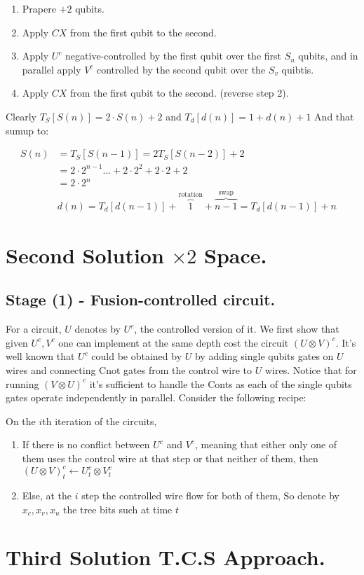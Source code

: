 \documentclass[manuscript,screen,review]{acmart}
\begin{document}
\begin{enumerate}
  \item Prapere $+2$ qubits.
  \item Apply $CX$ from the first qubit to the second.
  \item Apply $U^{c}$ negative-controlled by the first qubit over the first $S_{u}$ qubits, and in parallel apply $V^{c}$ controlled by the second qubit over the $S_{v}$ quibtis.   
  \item Apply $CX$ from the first qubit to the second. (reverse step 2).
\end{enumerate}
Clearly $T_{S}[S(n)] = 2 \cdot S(n) + 2$ and $T_{d}[d(n)] = 1 + d(n) + 1$ And that sumup to:

 
\begin{equation*}
\begin{split} S(n) & = T_{S}[S(n-1)] = 2T_{S}[S(n-2)] + 2  & \\ & = 
2\cdot 2^{n - 1}...+2\cdot 2^{2} +2\cdot 2 + 2 & \\ & = 2\cdot 2^{n} & \\ & d(n) = T_{d}[d(n-1)] + \overbrace{1}^{ \text{rotation} } + \overbrace{n-1}^{\text{swap}} =  T_{d}[d(n-1)] + n   \end{split} 
\end{equation*}

\section{Second Solution $\times 2$ Space. }

\subsection{Stage (1) - Fusion-controlled circuit.}

For a circuit, $U$ denotes by $U^{c}$, the controlled version of it. We first show that given $U^{c},V^{c}$ one can implement at the same depth cost the circuit $(U\otimes V)^{c}$. It's well known that $U^{c}$ could be obtained by $U$ by adding single qubits gates on $U$ wires and connecting Cnot gates from the control wire to $U$ wires. Notice that for running $(V\otimes U)^{c}$ it's sufficient to handle the Conts as each of the single qubits gates operate independently in parallel. Consider the following recipe: 

On the $i$th iteration of the circuits,
\begin{enumerate}  
  \item If there is no conflict between $U^{c}$ and $V^{c}$, meaning that either only one of them uses the control wire at that step or that neither of them, then $(U \otimes V)^{c}_{t} \leftarrow U^{c}_{t} \otimes V^{c}_{t}$
  \item Else, at the $i$ step the controlled wire flow for both of them, So denote by $ x_{c},x_{v},x_{u}$ the tree bits such at time $t$   

\end{enumerate}
  
 

\section{Third Solution T.C.S Approach.}  

\printbibliography
\end{document}
